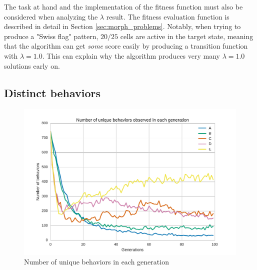 The task at hand and the implementation of the fitness function must also be considered when analyzing the $\lambda$ result.
The fitness evaluation function is described in detail in Section \ref{sec:morph_problems}.
Notably, when trying to produce a "Swiss flag" pattern, 
$20/25$ cells are active in the target state, meaning that the algorithm can get \textit{some} score easily by producing a transition function with $\lambda = 1.0$.
This can explain why the algorithm produces very many $\lambda=1.0$ solutions early on.




\subsection{Distinct behaviors}
\begin{figure}
\centering
\includegraphics[width=\columnwidth]{fig/unique_behaviors}
\caption{Number of unique behaviors in each generation}
\label{fig:unique_behaviors}
\end{figure}

